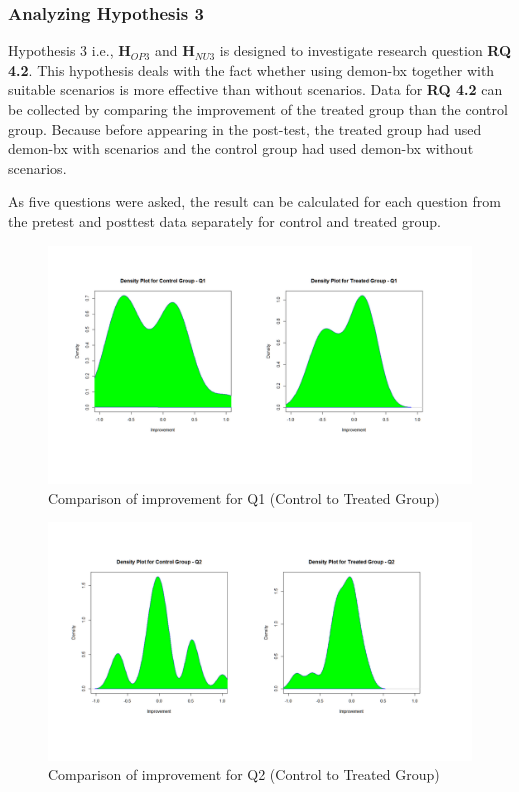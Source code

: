 \subsubsection{Analyzing Hypothesis 3}\label{subsubsec:hypothesis3}
Hypothesis 3 i.e., \textbf{H$_{OP3}$} and \textbf{H$_{NU3}$} is designed to investigate research question \textbf{RQ 4.2}. This hypothesis deals with the fact whether using demon-bx together with suitable scenarios is more effective than without scenarios. Data for \textbf{RQ 4.2} can be collected by comparing the improvement of the treated group than the control group. Because before appearing in the post-test, the treated group had used demon-bx with scenarios and the control group had used demon-bx without scenarios.

As five questions were asked, the result can be calculated for each question from the pretest and posttest data separately for control and treated group. 

\begin{figure}
	\centering
	\includegraphics[width=1\textwidth]{figures/Control-Treated_q1}
	\caption{Comparison of improvement for Q1 (Control to Treated Group)}
	\label{fig:Control-Treated_q1}
\end{figure}

\begin{figure}
	\centering
	\includegraphics[width=1\textwidth]{figures/Control-Treated_q2}
	\caption{Comparison of improvement for Q2 (Control to Treated Group)}
	\label{fig:Control-Treated_q2}
\end{figure}

